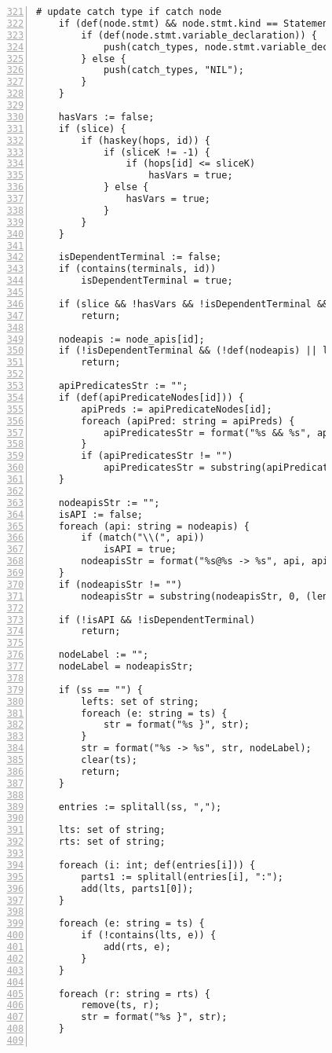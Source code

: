 \begin{figure}[ht!]
\begin{lstlisting}[numbers=left, tabsize=4, escapechar=@, caption={API Usage Mining Analysis},label={lst:aun-code},  firstline = 321, firstnumber = 321, lastline = 381]
	# update catch type if catch node
	if (def(node.stmt) && node.stmt.kind == StatementKind.CATCH) {
	    if (def(node.stmt.variable_declaration)) {
	        push(catch_types, node.stmt.variable_declaration.variable_type.name);    
	    } else {
	        push(catch_types, "NIL");
	    }
	}
	
	hasVars := false;
	if (slice) {
		if (haskey(hops, id)) {
			if (sliceK != -1) {
				if (hops[id] <= sliceK)
					hasVars = true;
			} else {
				hasVars = true;
			}	
		}
	}
	    
	isDependentTerminal := false;
	if (contains(terminals, id))
	    isDependentTerminal = true;
	    
	if (slice && !hasVars && !isDependentTerminal && !hasCatchOrFinally(ss))
	    return;
	    
	nodeapis := node_apis[id];
	if (!isDependentTerminal && (!def(nodeapis) || len(nodeapis) == 0))
	    return;
	    
	apiPredicatesStr := "";
	if (def(apiPredicateNodes[id])) { 
	    apiPreds := apiPredicateNodes[id];
	    foreach (apiPred: string = apiPreds) {
	        apiPredicatesStr = format("%s && %s", apiPredicatesStr, apiPred);
	    }
	    if (apiPredicatesStr != "")
	        apiPredicatesStr = substring(apiPredicatesStr, 4);
	}
	
	nodeapisStr := "";    
	isAPI := false;
	foreach (api: string = nodeapis) {
	    if (match("\\(", api))
	        isAPI = true;
	    nodeapisStr = format("%s@%s -> %s", api, apiPredicatesStr, nodeapisStr);    
	}
	if (nodeapisStr != "")
	    nodeapisStr = substring(nodeapisStr, 0, (len(nodeapisStr) - 4));
	    
	if (!isAPI && !isDependentTerminal) 
	    return;
	    
	nodeLabel := ""; 
	nodeLabel = nodeapisStr; 
	
	if (ss == "") {
	    lefts: set of string;
	    foreach (e: string = ts) {
            str = format("%s }", str);
	    }
	    str = format("%s -> %s", str, nodeLabel);
	    clear(ts);
		return;
	}
		
	entries := splitall(ss, ",");
	
	lts: set of string; 
	rts: set of string;
	
	foreach (i: int; def(entries[i])) {
		parts1 := splitall(entries[i], ":");
		add(lts, parts1[0]);
	}	
	
	foreach (e: string = ts) {
		if (!contains(lts, e)) {
			add(rts, e);
		}
	}
	
	foreach (r: string = rts) {
		remove(ts, r);
		str = format("%s }", str);
	}
	

\end{lstlisting}
\end{figure}
